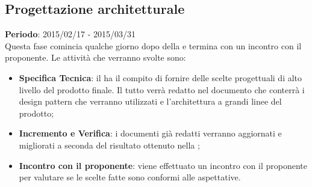 	\subsection{Progettazione architetturale} %
	\label{sub:progettazione_architetturale}
	\textbf{Periodo}:  2015/02/17 - 2015/03/31 \\
	Questa fase comincia qualche giorno dopo della \RR{} e termina con un incontro con il proponente.
	Le attività che verranno svolte sono:
		\begin{itemize}
			\item \textbf{Specifica Tecnica}: il \roleDesigner{} ha il compito di fornire delle scelte progettuali di alto livello del prodotto finale. Il tutto verrà redatto nel documento \docNameVersionST{} che conterrà i design pattern che verranno utilizzati e l'architettura a grandi linee del prodotto;
			\item \textbf{Incremento e Verifica}: i documenti già redatti verranno aggiornati e migliorati a seconda del risultato ottenuto nella \RR;
			\item \textbf{Incontro con il proponente}: viene effettuato un incontro con il proponente per valutare se le scelte fatte sono conformi alle aspettative.
		\end{itemize}
		
